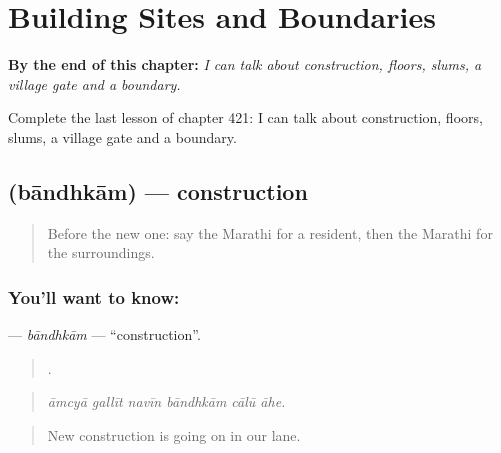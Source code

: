 
\chapter{Building Sites and Boundaries}
\label{ch:mr-building-sites-and-boundaries}

\begin{chapteropening}
\textbf{By the end of this chapter:} \emph{I can talk about construction, floors, slums, a village gate and a boundary.}

Complete the last lesson of chapter 421: I can talk about construction, floors, slums, a village gate and a boundary.
\end{chapteropening}

\section[\texorpdfstring{\mr{बांधकाम} (bāndhkām)}{बांधकाम (bāndhkām)}]{ (bāndhkām) — construction}

\label{lesson:MR-C421-bandhkam}



\begin{quote}
Before the new one: say the Marathi for a resident, then the Marathi for the surroundings.
\end{quote}

\subsection*{You'll want to know: }
\textbf{} — \emph{bāndhkām} — \textquotedblleft{}construction\textquotedblright{}.

\begin{quote}
     .
\end{quote}

\begin{quote}
\emph{āmcyā gallīt navīn bāndhkām cālū āhe.}
\end{quote}

\begin{quote}
New construction is going on in our lane.
\end{quote}

